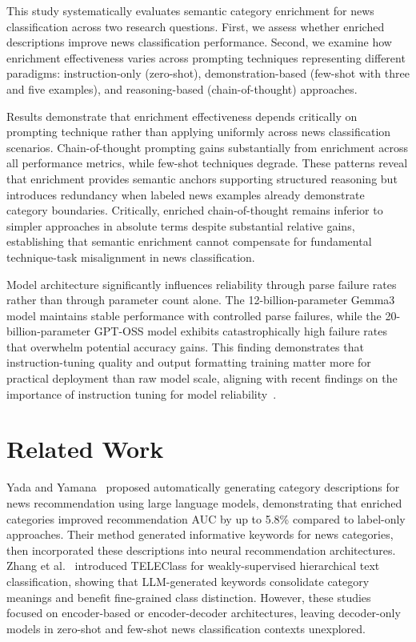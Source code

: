 \documentclass[sigconf,nonacm]{acmart}
\begin{document}
This study systematically evaluates semantic category enrichment for news classification across two research questions. First, we assess whether enriched descriptions improve news classification performance. Second, we examine how enrichment effectiveness varies across prompting techniques representing different paradigms: instruction-only (zero-shot), demonstration-based (few-shot with three and five examples), and reasoning-based (chain-of-thought) approaches.

Results demonstrate that enrichment effectiveness depends critically on prompting technique rather than applying uniformly across news classification scenarios. Chain-of-thought prompting gains substantially from enrichment across all performance metrics, while few-shot techniques degrade. These patterns reveal that enrichment provides semantic anchors supporting structured reasoning but introduces redundancy when labeled news examples already demonstrate category boundaries. Critically, enriched chain-of-thought remains inferior to simpler approaches in absolute terms despite substantial relative gains, establishing that semantic enrichment cannot compensate for fundamental technique-task misalignment in news classification.

Model architecture significantly influences reliability through parse failure rates rather than through parameter count alone. The 12-billion-parameter Gemma3 model maintains stable performance with controlled parse failures, while the 20-billion-parameter GPT-OSS model exhibits catastrophically high failure rates that overwhelm potential accuracy gains. This finding demonstrates that instruction-tuning quality and output formatting training matter more for practical deployment than raw model scale, aligning with recent findings on the importance of instruction tuning for model reliability~\cite{zhang2023instruction, gretz2023zero}.

\section{Related Work}

Yada and Yamana~\cite{yada2024news} proposed automatically generating category descriptions for news recommendation using large language models, demonstrating that enriched categories improved recommendation AUC by up to 5.8\% compared to label-only approaches. Their method generated informative keywords for news categories, then incorporated these descriptions into neural recommendation architectures. Zhang et al.~\cite{zhang2024teleclass} introduced TELEClass for weakly-supervised hierarchical text classification, showing that LLM-generated keywords consolidate category meanings and benefit fine-grained class distinction. However, these studies focused on encoder-based or encoder-decoder architectures, leaving decoder-only models in zero-shot and few-shot news classification contexts unexplored.
\end{document}
